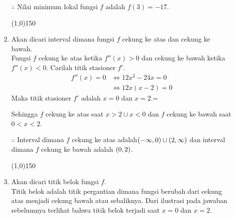 \begin{enumerate}[leftmargin=*, label={\arabic*}.]
\begin{enumerate}[label={\alph*}.]
    $\therefore$ Nilai minimum lokal fungsi $f$ adalah $f(3)=-17$.
\begin{center}
    \line(1,0){150}
\end{center}
    \item Akan dicari interval dimana fungsi $f$ cekung ke atas dan cekung ke bawah.\\
    Fungsi $f$ cekung ke atas ketika $f''(x) > 0$ dan cekung ke bawah ketika $f''(x)<0.$
    Carilah titik stasioner $f'$.
    \begin{align*}
        f''(x)=0 &\iff 12x^{2}-24x=0\\
        &\iff 12x(x-2) = 0
    \end{align*}
    Maka titik stasioner $f'$ adalah $x=0$ dan $x=2$.=
    \begin{center}
    \end{center}
    Sehingga $f$ cekung ke atas saat $x > 2 \cup x < 0$ dan $f$ cekung ke bawah saat 
    $0 < x < 2$.

    $\therefore$ Interval dimana $f$ cekung ke atas adalah$(-\infty,0)\cup(2,\infty)$ 
    dan interval dimana $f$ cekung ke bawah adalah $(0,2)$.
\begin{center}
    \line(1,0){150}
\end{center}
    \item Akan dicari titik belok fungsi $f$.\\
    Titik belok adalah titik pergantian dimana fungsi berubah dari cekung atas menjadi cekung bawah 
    atau sebaliknya. Dari ilustrasi pada jawaban sebelumnya terlihat bahwa titik belok terjadi saat 
    $x=0$ dan $x=2$.


\end{enumerate}
\end{enumerate}
